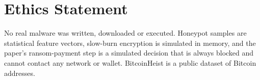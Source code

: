 \documentclass[11pt]{article}
\begin{document}
\section*{Ethics Statement}
No real malware was written, downloaded or executed. Honeypot samples are statistical feature
vectors, slow-burn encryption is simulated in memory, and the paper's ransom-payment step is a
simulated decision that is always blocked and cannot contact any network or wallet. BitcoinHeist is
a public dataset of Bitcoin addresses.


\end{document}
